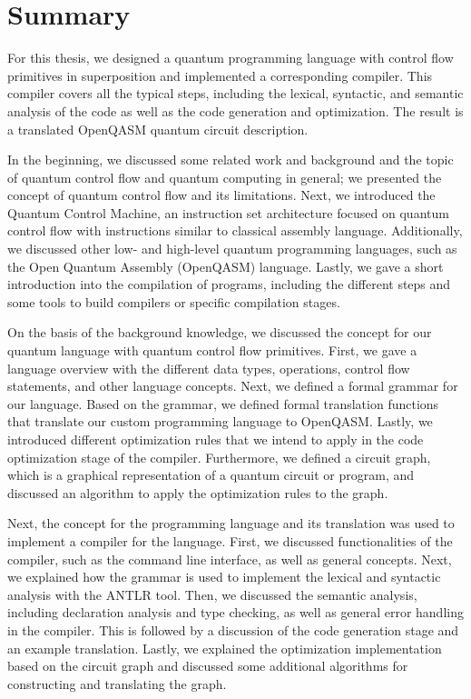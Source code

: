 \section{Summary}
For this thesis, we designed a quantum programming language with control flow primitives in superposition and implemented a corresponding compiler. This compiler covers all the typical steps, including the lexical, syntactic, and semantic analysis of the code as well as the code generation and optimization. The result is a translated OpenQASM quantum circuit description.

In the beginning, we discussed some related work and background and the topic of quantum control flow and quantum computing in general; we presented the concept of quantum control flow and its limitations. Next, we introduced the Quantum Control Machine, an instruction set architecture focused on quantum control flow with instructions similar to classical assembly language. Additionally, we discussed other low- and high-level quantum programming languages, such as the Open Quantum Assembly (OpenQASM) language. Lastly, we gave a short introduction into the compilation of programs, including the different steps and some tools to build compilers or specific compilation stages.

On the basis of the background knowledge, we discussed the concept for our quantum language with quantum control flow primitives. First, we gave a language overview with the different data types, operations, control flow statements, and other language concepts. Next, we defined a formal grammar for our language. Based on the grammar, we defined formal translation functions that translate our custom programming language to OpenQASM. Lastly, we introduced different optimization rules that we intend to apply in the code optimization stage of the compiler. Furthermore, we defined a circuit graph, which is a graphical representation of a quantum circuit or program, and discussed an algorithm to apply the optimization rules to the graph.

Next, the concept for the programming language and its translation was used to implement a compiler for the language. First, we discussed functionalities of the compiler, such as the command line interface, as well as general concepts. Next, we explained how the grammar is used to implement the lexical and syntactic analysis with the ANTLR tool. Then, we discussed the semantic analysis, including declaration analysis and type checking, as well as general error handling in the compiler. This is followed by a discussion of the code generation stage and an example translation. Lastly, we explained the optimization implementation based on the circuit graph and discussed some additional algorithms for constructing and translating the graph.


